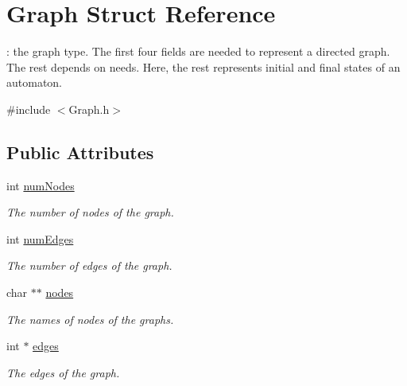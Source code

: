 \hypertarget{structGraph}{}\section{Graph Struct Reference}
\label{structGraph}


\+: the graph type. The first four fields are needed to represent a directed graph. The rest depends on needs. Here, the rest represents initial and final states of an automaton.  




{\ttfamily \#include $<$Graph.\+h$>$}

\subsection*{Public Attributes}
\begin{DoxyCompactItemize}
\item 
\mbox{\label{structGraph_ad3db12d7f8327a6717fd161d694e43c0}} 
int \mbox{\hyperlink{structGraph_ad3db12d7f8327a6717fd161d694e43c0}{num\+Nodes}}
\begin{DoxyCompactList}\small\item\em The number of nodes of the graph. \end{DoxyCompactList}\item 
\mbox{\label{structGraph_a4f98dc06b0c1e32b27fa26efc0e11777}} 
int \mbox{\hyperlink{structGraph_a4f98dc06b0c1e32b27fa26efc0e11777}{num\+Edges}}
\begin{DoxyCompactList}\small\item\em The number of edges of the graph. \end{DoxyCompactList}\item 
\mbox{\label{structGraph_aa08cad811e4bd8af7d8592d215009205}} 
char $\ast$$\ast$ \mbox{\hyperlink{structGraph_aa08cad811e4bd8af7d8592d215009205}{nodes}}
\begin{DoxyCompactList}\small\item\em The names of nodes of the graphs. \end{DoxyCompactList}\item 
\mbox{\label{structGraph_a672e795801f3850405a178daaa98d4c0}} 
int $\ast$ \mbox{\hyperlink{structGraph_a672e795801f3850405a178daaa98d4c0}{edges}}
\begin{DoxyCompactList}\small\item\em The edges of the graph. \end{DoxyCompactList}\item 
$$
\end{DoxyCompactItemize}
